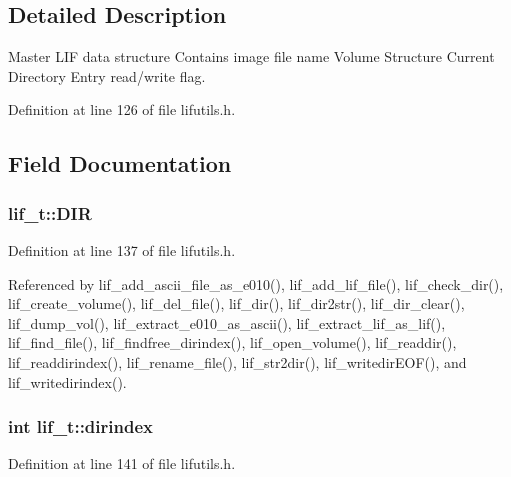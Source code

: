 \subsection{Detailed Description}
Master L\+IF data structure Contains image file name Volume Structure Current Directory Entry read/write flag. 

Definition at line 126 of file lifutils.\+h.



\subsection{Field Documentation}
\subsubsection[{\texorpdfstring{D\+IR}{DIR}}]{ lif\+\_\+t\+::\+D\+IR}\hypertarget{structlif__t_aefeaa526c04a2b8715b0392feeec52a3}{}\label{structlif__t_aefeaa526c04a2b8715b0392feeec52a3}


Definition at line 137 of file lifutils.\+h.



Referenced by lif\+\_\+add\+\_\+ascii\+\_\+file\+\_\+as\+\_\+e010(), lif\+\_\+add\+\_\+lif\+\_\+file(), lif\+\_\+check\+\_\+dir(), lif\+\_\+create\+\_\+volume(), lif\+\_\+del\+\_\+file(), lif\+\_\+dir(), lif\+\_\+dir2str(), lif\+\_\+dir\+\_\+clear(), lif\+\_\+dump\+\_\+vol(), lif\+\_\+extract\+\_\+e010\+\_\+as\+\_\+ascii(), lif\+\_\+extract\+\_\+lif\+\_\+as\+\_\+lif(), lif\+\_\+find\+\_\+file(), lif\+\_\+findfree\+\_\+dirindex(), lif\+\_\+open\+\_\+volume(), lif\+\_\+readdir(), lif\+\_\+readdirindex(), lif\+\_\+rename\+\_\+file(), lif\+\_\+str2dir(), lif\+\_\+writedir\+E\+O\+F(), and lif\+\_\+writedirindex().

\subsubsection[{\texorpdfstring{dirindex}{dirindex}}]{\setlength{\rightskip}{0pt plus 5cm}int lif\+\_\+t\+::dirindex}\hypertarget{structlif__t_a74f8af3dc203c3c6b9dea3829bb4b6fa}{}\label{structlif__t_a74f8af3dc203c3c6b9dea3829bb4b6fa}


Definition at line 141 of file lifutils.\+h.



